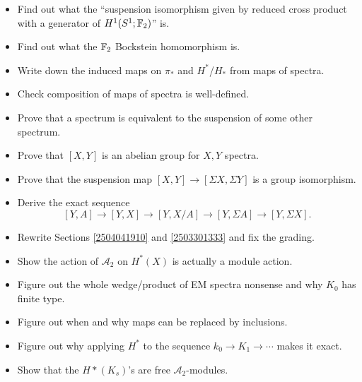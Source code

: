 \documentclass{MetricNotes2023}
\def\bb{\ensuremath\mathbb}
\def\A{\ensuremath{\mathscr{A}_2}}
\begin{document}
\begin{itemize}
\item Find out what the ``suspension isomorphism given by reduced cross product with a generator of \(H^1(S^1; \bb{F}_2)\)'' is. 

\item Find out what the \(\bb{F}_2\) Bockstein homomorphism is.

\item Write down the induced maps on \(\pi_*\) and \(H^*\)/\(H_*\) from maps of spectra.

\item Check composition of maps of spectra is well-defined.

\item Prove that a spectrum is equivalent to the suspension of some other spectrum.

\item Prove that \([X,Y]\) is an abelian group for \(X,Y\) spectra.

\item Prove that the suspension map \([X,Y]\to [\Sigma X, \Sigma Y]\) is a group isomorphism. 

\item Derive the exact sequence
\[[Y,A]\to [Y,X]\to [Y, X/A]\to [Y, \Sigma A]\to [Y, \Sigma X].\]

\item Rewrite Sections \ref{2504041910} and \ref{2503301333} and fix the grading.

\item Show the action of \(\A\) on \(H^*(X)\) is actually a module action.

\item Figure out the whole wedge/product of EM spectra nonsense and why \(K_0\) has finite type. 

\item Figure out when and why maps can be replaced by inclusions.

\item Figure out why applying \(H^*\) to the sequence \(k_0\to K_1 \to \cdots\) makes it exact.

\item Show that the \(H*(K_s)\)'s are free \(\A\)-modules.


\end{itemize}
\end{document}
